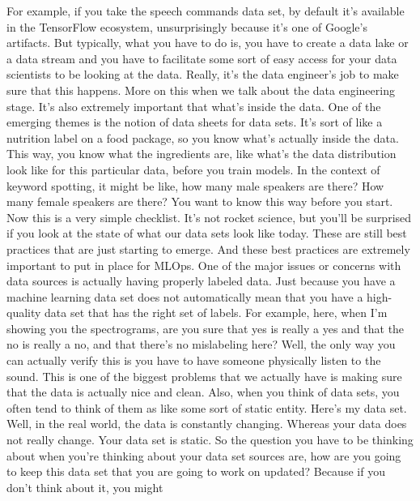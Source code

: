     For example, if you take the speech commands data set, by default
    it's available in the TensorFlow ecosystem,
    unsurprisingly because it's one of Google's artifacts.
    But typically, what you have to do is, you
    have to create a data lake or a data stream
    and you have to facilitate some sort of easy access for your data scientists
    to be looking at the data.
    Really, it's the data engineer's job to make sure that this happens.
    More on this when we talk about the data engineering stage.
    It's also extremely important that what's inside the data.
    One of the emerging themes is the notion of data sheets for data sets.
    It's sort of like a nutrition label on a food package,
    so you know what's actually inside the data.
    This way, you know what the ingredients are,
    like what's the data distribution look like for this particular data,
    before you train models.
    In the context of keyword spotting, it might be like,
    how many male speakers are there?
    How many female speakers are there?
    You want to know this way before you start.
    Now this is a very simple checklist.
    It's not rocket science, but you'll be surprised
    if you look at the state of what our data sets look like today.
    These are still best practices that are just starting to emerge.
    And these best practices are extremely important to put in place for MLOps.
    One of the major issues or concerns with data sources
    is actually having properly labeled data.
    Just because you have a machine learning data set
    does not automatically mean that you have a high-quality data
    set that has the right set of labels.
    For example, here, when I'm showing you the spectrograms,
    are you sure that yes is really a yes and that the no is really a no,
    and that there's no mislabeling here?
    Well, the only way you can actually verify this is you
    have to have someone physically listen to the sound.
    This is one of the biggest problems that we actually
    have is making sure that the data is actually nice and clean.
    Also, when you think of data sets, you often
    tend to think of them as like some sort of static entity.
    Here's my data set.
    Well, in the real world, the data is constantly changing.
    Whereas your data does not really change.
    Your data set is static.
    So the question you have to be thinking about when you're
    thinking about your data set sources are,
    how are you going to keep this data set that you are going to work on updated?
    Because if you don't think about it, you might
